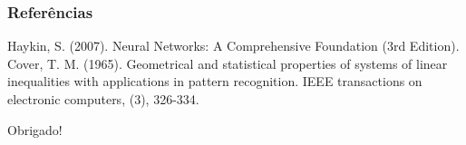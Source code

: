 \documentclass{beamer}
\begin{document}

%
%
%
%
%
%
%


\begin{frame}
\frametitle{Referências}
\footnotesize{
\begin{thebibliography}{99} %
Haykin, S. (2007). Neural Networks: A Comprehensive Foundation (3rd Edition).
Cover, T. M. (1965). Geometrical and statistical properties of systems of linear inequalities with applications in pattern recognition. IEEE transactions on electronic computers, (3), 326-334.

\end{thebibliography}
}
\end{frame}


\begin{frame}
\Huge{\centerline{Obrigado!}}
\end{frame}

\end{document}
